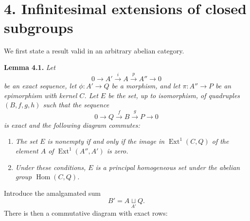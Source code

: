 

\section*{4. Infinitesimal extensions of closed subgroups}

We first state a result valid in an arbitrary abelian category.

\medskip
\noindent{}\textbf{Lemma 4.1.}
\textit{Let
\[
 0\longrightarrow A'\xrightarrow{i}A\xrightarrow{p}A''\longrightarrow0
\]
be an exact sequence, let \(\phi:A'\to Q\) be a morphism, and let
\(\pi:A''\to P\) be an epimorphism with kernel \(C\). Let \(E\) be the
set, up to isomorphism, of quadruples \((B,f,g,h)\) such that the sequence
\[
 0\longrightarrow Q\xrightarrow{f}B\xrightarrow{g}P\longrightarrow0
\]
is exact and the following diagram commutes:}

\begin{center}
\end{center}

\begin{enumerate}
\item[(i)] \textit{The set \(E\) is nonempty if and only if the image in
  \(\operatorname{Ext}^1(C,Q)\) of the element \(A\) of
  \(\operatorname{Ext}^1(A'',A')\) is zero.}
\item[\SGAInlineRefTarget{sga3:iii:lemma:4-1:item:ii}(ii)] \textit{Under these conditions, \(E\) is a principal homogeneous
  set under the abelian group \(\operatorname{Hom}(C,Q)\).}
\end{enumerate}

Introduce the amalgamated sum
\[
 B'=A\mathop{\sqcup}\limits_{A'}Q.
\]
There is then a commutative diagram with exact rows:

\begin{center}
\end{center}

